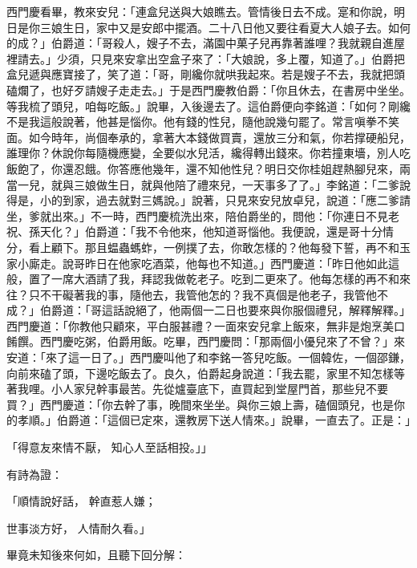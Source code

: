\begin{showcontents}{}
西門慶看畢，教來安兒：「連盒兒送與大娘瞧去。管情後日去不成。寔和你說，明日是你三娘生日，家中又是安郎中擺酒。二十八日他又要往看夏大人娘子去。如何的成？」伯爵道：「哥殺人，嫂子不去，滿園中菓子兒再靠著誰哩？我就親自進屋裡請去。」少須，只見來安拿出空盒子來了：「大娘說，多上覆，知道了。」伯爵把盒兒遞與應寶接了，笑了道：「哥，剛纔你就哄我起來。若是嫂子不去，我就把頭磕爛了，也好歹請嫂子走走去。」于是西門慶教伯爵：「你且休去，在書房中坐坐。等我梳了頭兒，咱每吃飯。」說畢，入後邊去了。這伯爵便向李銘道：「如何？剛纔不是我這般說著，他甚是惱你。他有錢的性兒，隨他說幾句罷了。常言嗔拳不笑面。如今時年，尚個奉承的，拿著大本錢做買賣，還放三分和氣，你若撑硬船兒，誰理你？休說你每隨機應變，全要似水兒活，纔得轉出錢來。你若撞東墻，別人吃飯飽了，你還忍餓。你答應他幾年，還不知他性兒？明日交你桂姐趕熱腳兒來，兩當一兒，就與三娘做生日，就與他陪了禮來兒，一天事多了了。」李銘道：「二爹說得是，小的到家，過去就對三媽說。」說著，只見來安兒放卓兒，說道：「應二爹請坐，爹就出來。」不一時，西門慶梳洗出來，陪伯爵坐的，問他：「你連日不見老祝、孫天化？」伯爵道：「我不令他來，他知道哥惱他。我便說，還是哥十分情分，看上顧下。那且蝹蟲螞蚱，一例撲了去，你敢怎樣的？他每發下誓，再不和玉家小廝走。說哥昨日在他家吃酒菜，他每也不知道。」西門慶道：「昨日他如此這般，置了一席大酒請了我，拜認我做乾老子。吃到二更來了。他每怎樣的再不和來往？只不干礙著我的事，隨他去，我管他怎的？我不真個是他老子，我管他不成？」伯爵道：「哥這話說絕了，他兩個一二日也要來與你服個禮兒，解釋解釋。」西門慶道：「你教他只顧來，平白服甚禮？一面來安兒拿上飯來，無非是炮烹美口餚饌。西門慶吃粥，伯爵用飯。吃畢，西門慶問：「那兩個小優兒來了不曾？」來安道：「來了這一日了。」西門慶叫他了和李銘一答兒吃飯。一個韓佐，一個邵鎌，向前來磕了頭，下邊吃飯去了。良久，伯爵起身說道：「我去罷，家里不知怎樣等著我哩。小人家兒幹事最苦。先從爐臺底下，直買起到堂屋門首，那些兒不要買？」西門慶道：「你去幹了事，晚間來坐坐。與你三娘上壽，磕個頭兒，也是你的孝順。」伯爵道：「這個已定來，還教房下送人情來。」說畢，一直去了。正是：」

「得意友來情不厭，  知心人至話相投。」」

有詩為證：

「順情說好話，  幹直惹人嫌；

世事淡方好，  人情耐久看。」

畢竟未知後來何如，且聽下回分解：






\end{showcontents}



